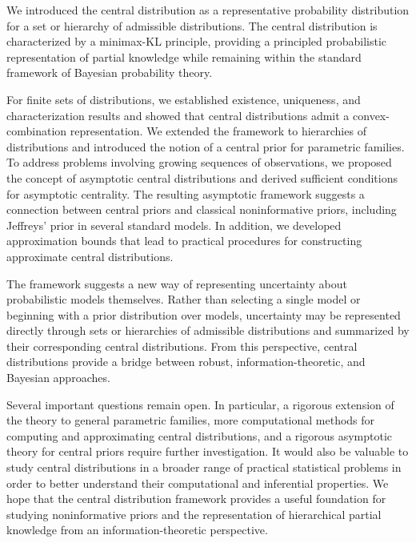 We introduced the central distribution as a representative probability distribution for a set or
hierarchy of admissible distributions.
The central distribution is characterized by a minimax-KL principle, providing a principled probabilistic
representation of partial knowledge while remaining within the standard framework of Bayesian probability theory.

For finite sets of distributions, we established existence, uniqueness, and characterization results and showed that
central distributions admit a convex-combination representation.
We extended the framework to hierarchies of distributions and introduced the notion of a central prior for
parametric families.
To address problems involving growing sequences of observations, we proposed the concept of asymptotic central
distributions and derived sufficient conditions for asymptotic centrality.
The resulting asymptotic framework suggests a connection between central priors and classical noninformative priors,
including Jeffreys' prior in several standard models.
In addition, we developed approximation bounds that lead to practical procedures for constructing approximate
central distributions.

The framework suggests a new way of representing uncertainty about probabilistic models themselves.
Rather than selecting a single model or beginning with a prior distribution over models, uncertainty may be
represented directly through sets or hierarchies of admissible distributions and summarized by their corresponding
central distributions.
From this perspective, central distributions provide a bridge between robust, information-theoretic, and Bayesian
approaches.

Several important questions remain open.
In particular, a rigorous extension of the theory to general parametric families,
more computational methods for computing and approximating central distributions,
and a rigorous asymptotic theory for central priors require further investigation.
It would also be valuable to study central distributions in a broader range of practical statistical problems in
order to better understand their computational and inferential properties.
We hope that the central distribution framework provides a useful foundation for studying noninformative priors and
the representation of hierarchical partial knowledge from an information-theoretic perspective.
